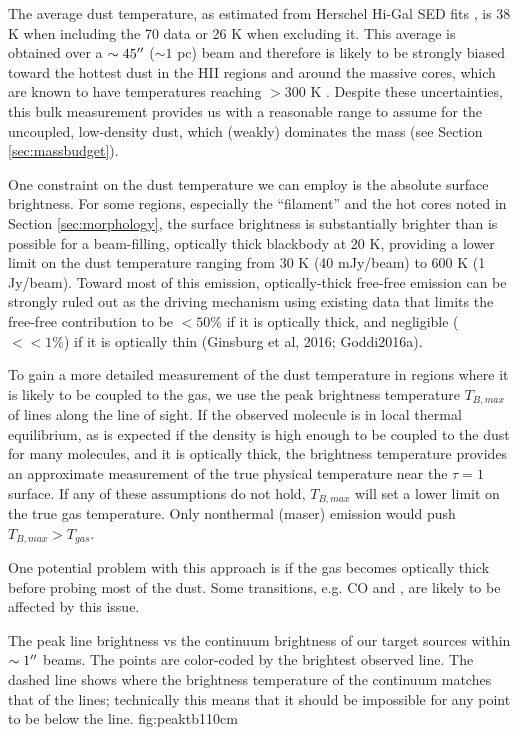 \documentclass{aa}
\begin{document}
The average dust temperature, as estimated from Herschel Hi-Gal SED fits
\citep{Molinari2016a,Wang2015a}, is 38 K when including the 70 \um data or 26 K
when excluding it.  This average is obtained over a $\sim45\mbox{$^{\prime\prime}$}$ ($\sim 1$
pc) beam and therefore is likely to be strongly biased toward the hottest dust
in the HII regions and around the massive cores, which are known to have
temperatures reaching $>300$ K \citep{Goddi2016a}.  Despite these
uncertainties, this bulk measurement provides us with a reasonable range to
assume for the uncoupled, low-density dust, which (weakly) dominates the mass
(see Section \ref{sec:massbudget}).

One constraint on the dust temperature we can employ is the absolute surface
brightness.  For some regions, especially the ``filament'' and the hot cores
noted in Section \ref{sec:morphology}, the surface brightness is substantially
brighter than is possible for a beam-filling, optically thick blackbody at 20
K, providing a lower limit on the dust temperature ranging from 30 K (40
mJy/beam) to 600 K (1 Jy/beam).  Toward most of this emission, optically-thick
free-free emission can be strongly ruled out as the driving mechanism using
existing data that limits the free-free contribution to be $<50\%$ if it is
optically thick, and negligible ($<<1\%$) if it is optically thin (Ginsburg et
al, 2016; Goddi2016a).

To gain a more detailed measurement of the dust temperature in regions where it
is likely to be coupled to the gas, we use the peak brightness temperature
$T_{B,max}$ of lines along the line of sight.  If the observed molecule is in
local thermal equilibrium, as is expected if the density is high enough to be
coupled to the dust for many molecules, and it is optically thick, the
brightness temperature provides an approximate measurement of the true physical
temperature near the $\tau=1$ surface.  If any of these assumptions do not
hold, $T_{B,max}$ will set a lower limit on the true gas temperature.  Only
nonthermal (maser) emission would push $T_{B,max} > T_{gas}$.

One potential problem with this approach is if the gas becomes optically thick
before probing most of the dust.  Some transitions, e.g. CO and \formaldehyde, 
are likely to be affected by this issue.


{The peak line brightness vs the continuum brightness of our target sources
within $\sim1\mbox{$^{\prime\prime}$}$ beams.  The points are color-coded by the brightest
observed line.  The dashed line shows where the brightness temperature of the
continuum matches that of the lines; technically this means that it should be
impossible for any point to be below the line.  
}
{fig:peaktb}{1}{10cm}
\end{document}
